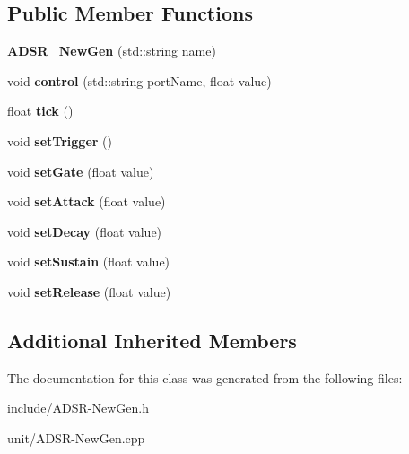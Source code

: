 \subsection*{Public Member Functions}
\begin{DoxyCompactItemize}
\item 
\hypertarget{classunit_1_1ADSR__NewGen_ac8dbe9f3fab627d291ed34996e97d73e}{{\bfseries A\-D\-S\-R\-\_\-\-New\-Gen} (std\-::string name)}\label{classunit_1_1ADSR__NewGen_ac8dbe9f3fab627d291ed34996e97d73e}

\item 
\hypertarget{classunit_1_1ADSR__NewGen_ae5d3a6e3e2be04a470eeb30767e11a58}{void {\bfseries control} (std\-::string port\-Name, float value)}\label{classunit_1_1ADSR__NewGen_ae5d3a6e3e2be04a470eeb30767e11a58}

\item 
\hypertarget{classunit_1_1ADSR__NewGen_a9ec42e7edded490dbe69cbe93883b168}{float {\bfseries tick} ()}\label{classunit_1_1ADSR__NewGen_a9ec42e7edded490dbe69cbe93883b168}

\item 
\hypertarget{classunit_1_1ADSR__NewGen_af3002642e550abcfe4be667d027670a9}{void {\bfseries set\-Trigger} ()}\label{classunit_1_1ADSR__NewGen_af3002642e550abcfe4be667d027670a9}

\item 
\hypertarget{classunit_1_1ADSR__NewGen_a222a12be57cca522ece84deac512c330}{void {\bfseries set\-Gate} (float value)}\label{classunit_1_1ADSR__NewGen_a222a12be57cca522ece84deac512c330}

\item 
\hypertarget{classunit_1_1ADSR__NewGen_aa725e7a7c15ac05c643f3a9df9542c66}{void {\bfseries set\-Attack} (float value)}\label{classunit_1_1ADSR__NewGen_aa725e7a7c15ac05c643f3a9df9542c66}

\item 
\hypertarget{classunit_1_1ADSR__NewGen_aa43684929b80892b7d91ec75303fd00c}{void {\bfseries set\-Decay} (float value)}\label{classunit_1_1ADSR__NewGen_aa43684929b80892b7d91ec75303fd00c}

\item 
\hypertarget{classunit_1_1ADSR__NewGen_a91036e95f48e88f71973dced76097563}{void {\bfseries set\-Sustain} (float value)}\label{classunit_1_1ADSR__NewGen_a91036e95f48e88f71973dced76097563}

\item 
\hypertarget{classunit_1_1ADSR__NewGen_af7e268918cef20f67514df7356f0fb15}{void {\bfseries set\-Release} (float value)}\label{classunit_1_1ADSR__NewGen_af7e268918cef20f67514df7356f0fb15}

\end{DoxyCompactItemize}
\subsection*{Additional Inherited Members}


The documentation for this class was generated from the following files\-:\begin{DoxyCompactItemize}
\item 
include/A\-D\-S\-R-\/\-New\-Gen.\-h\item 
unit/A\-D\-S\-R-\/\-New\-Gen.\-cpp\end{DoxyCompactItemize}
